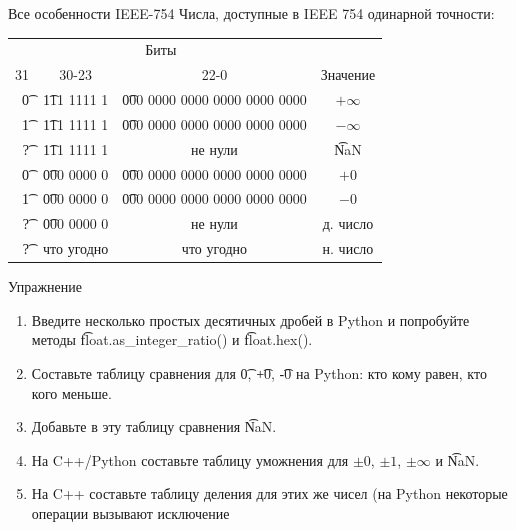 \begin{frame}{Все особенности IEEE-754}
	Числа, доступные в IEEE 754 одинарной точности:
	\begin{center}
		\begin{tabular}{r|c|c|c}
			\multicolumn{3}{c}{Биты} & \\
			31 & 30-23 & 22-0 & Значение \\\hline
			\t{0} & \t{111 1111 1} & \t{000 0000 0000 0000 0000 0000} & $+\infty $\\
			\t{1} & \t{111 1111 1} & \t{000 0000 0000 0000 0000 0000} & $-\infty $\\
			\t{?} & \t{111 1111 1} & не нули                          & \t{NaN} \\
			\t{0} & \t{000 0000 0} & \t{000 0000 0000 0000 0000 0000} & $+0$ \\
			\t{1} & \t{000 0000 0} & \t{000 0000 0000 0000 0000 0000} & $-0$ \\
			\t{?} & \t{000 0000 0} & не нули                          & д. число \\
			\t{?} & что угодно     & что угодно                       & н. число \\
		\end{tabular}
	\end{center}	
\end{frame}

\begin{frame}{Упражнение}
	\begin{enumerate}
		\item
			Введите несколько простых десятичных дробей в Python и попробуйте методы \t{float.as\_integer\_ratio()} и \t{float.hex()}.
		\item
			Составьте таблицу сравнения для \t{0}, \t{+0}, \t{-0} на Python: кто кому равен, кто кого меньше.
		\item
			Добавьте в эту таблицу сравнения \t{NaN}.
		\item
			На C++/Python составьте таблицу уможнения для $\pm0$, $\pm 1$, $\pm \infty$ и \t{NaN}.
		\item
			На C++ составьте таблицу деления для этих же чисел (на Python некоторые операции вызывают исключение
	\end{enumerate}
\end{frame}
